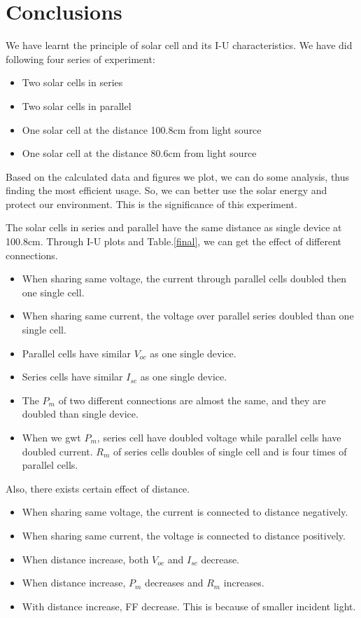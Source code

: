 \documentclass[12pt,a4paper]{article}
\begin{document}
\section{Conclusions}
We have learnt the principle of solar cell and its I-U characteristics. We have did following four series of experiment:
\begin{itemize}
    \item Two solar cells in series
    \item Two solar cells in parallel
    \item One solar cell at the distance 100.8cm from light source
    \item One solar cell at the distance 80.6cm from light source
\end{itemize}
Based on the calculated data and figures we plot, we can do some analysis, thus finding the most efficient usage. So, we can better use the solar energy and protect our environment. This is the significance of this experiment.\par
The solar cells in series and parallel have the same distance as single device at 100.8cm.
Through I-U plots and Table.\ref{final}, we can get the effect of different connections.
\begin{itemize}
    \item 	When sharing same voltage, the current through parallel cells doubled then one single cell.
    \item   When sharing same current, the voltage over parallel series doubled than one single cell.
    \item Parallel cells have similar $V_{oc}$ as one single device.
    \item Series cells have similar $I_{sc}$ as one single device.
    \item The $P_m$ of two different connections are almost the same, and they are doubled than single device.
    \item When we gwt $P_m$, series cell have doubled voltage while parallel cells have doubled current. $R_m$ of series cells doubles of single cell and is four times of parallel cells.
\end{itemize}
Also, there exists certain effect of distance.
\begin{itemize}
    \item 	When sharing same voltage, the current is connected to distance negatively.
    \item When sharing same current, the voltage is connected to distance positively.
	\item When distance increase, both $V_{oc}$ and $I_{sc}$ decrease.
	\item When distance increase, $P_m$ decreases and $R_m$ increases.
    \item With distance increase, FF decrease. This is because of smaller incident light.
\end{itemize}
\end{document}
